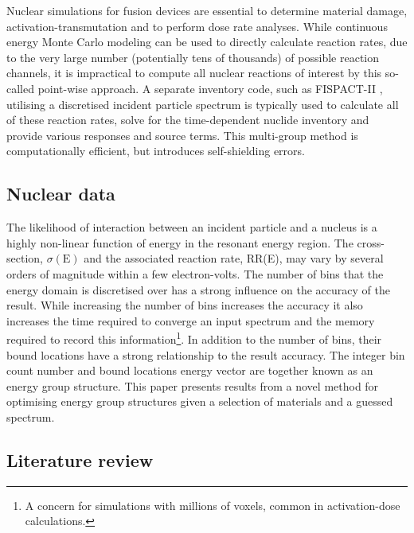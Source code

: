 
Nuclear simulations for fusion devices are essential to determine material damage, activation-transmutation and to perform dose rate analyses. While continuous energy Monte Carlo modeling can be used to directly calculate reaction rates, due to the very large number (potentially tens of thousands) of possible reaction channels, it is impractical to compute all nuclear reactions of interest by this so-called point-wise approach. A separate inventory code, such as FISPACT-II \cite{fispact2015}, utilising a discretised incident particle spectrum is typically used to calculate all of these reaction rates, solve for the time-dependent nuclide inventory and provide various responses and source terms. This multi-group method is computationally efficient, but introduces self-shielding errors.

\subsection{Nuclear data}

The likelihood of interaction between an incident particle and a nucleus is a highly non-linear function of energy in the resonant energy region. The cross-section, $\sigma(\mathrm{E})$ and the associated reaction rate, RR(E), may vary by several orders of magnitude within a few electron-volts. The number of bins that the energy domain is discretised over has a strong influence on the accuracy of the result. While increasing the number of bins increases the accuracy it also increases the time required to converge an input spectrum and the memory required to record this information\footnote{A concern for simulations with millions of voxels, common in activation-dose calculations.}. In addition to the number of bins, their bound locations have a strong relationship to the result accuracy. The integer bin count number and bound locations energy vector are together known as an energy group structure. This paper presents results from a novel method for optimising energy group structures given a selection of materials and a guessed spectrum.

\subsection{Literature review}

